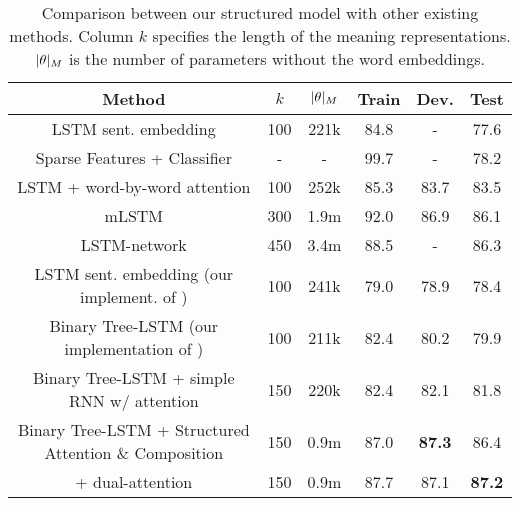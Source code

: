 
\begin{table*}
\begin{center}
\small
\begin{tabular}{c|cccHc}
Method & $k$ & $\lvert\theta\rvert_M$ & Train & Dev. & Test\\
\hline\hline
LSTM sent. embedding \cite{bowman2015large} 
& 100 & 221k & 84.8 & - & 77.6\\ \hline
Sparse Features + Classifier \cite{bowman2015large} 
& - & - & 99.7 & - & 78.2\\ \hline
LSTM + word-by-word attention \cite{rocktaschel2015reasoning}
& 100 & 252k & 85.3 & 83.7 & 83.5\\ 
\hline
mLSTM \cite{wang2015learning} & 300 & 1.9m &92.0 & 86.9 & 86.1\\ 
\hline
LSTM-network \cite{cheng2016long} & 450 & 3.4m & 88.5 & - & 86.3\\
\hline \hline

LSTM sent. embedding (our implement. of )&100& 241k &79.0 & 78.9 & 78.4 \\ \hline
Binary Tree-LSTM (our implementation of )& 100& 211k &82.4 & 80.2 & 79.9\\ \hline
Binary Tree-LSTM + simple RNN w/ attention & 150 & 220k &82.4 & 82.1 & 81.8\\
\hline
\hline
Binary Tree-LSTM + Structured Attention \& Composition & 150 & 0.9m & 87.0 & {\bf 87.3} & 86.4\\
\hline 
+ dual-attention & 150 & 0.9m & 87.7 & 87.1 & {\bf 87.2}
\end{tabular}
\end{center}
\vspace{-0.2cm}
\caption{Comparison between our structured model with other existing methods.
Column $k$ specifies the length of the meaning representations.
$\lvert\theta\rvert_M$ is the number of parameters
without the word embeddings.
\label{tab:results}}
\end{table*}

\iffalse
\begin{figure}
\centering
\texttt{[image: figures/treelstm.pdf]}
\caption{Transitions in one Tree-LSTM unit \protect\cite{tai2015improved}.
The parent node is denoted with subscript $j$,
and the children node with $j,1$ and $j,2$.
At each node, $\vecc$ represents the memory cell, 
$\vech$ represents the output,
and $\vecx$ represents the optional meaning representation of the word.
Some edges are labeled with the corresponding gates 
controlling the propagation of the information.
\label{fig:treelstm}}
\vspace{-0.4cm}
\end{figure}
\fi